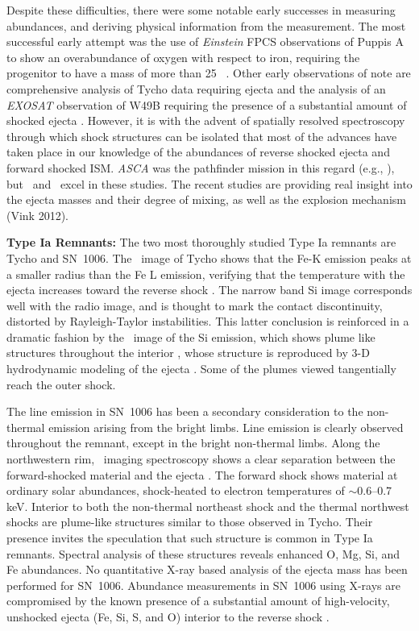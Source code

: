 \documentclass[11pt,a4paper]{article}
\begin{document}
{Despite these difficulties, there were some notable early successes in
measuring abundances, and deriving physical information from the
measurement. The most successful early attempt was the use of 
{\it Einstein} FPCS observations of Puppis A to show an overabundance of
oxygen with respect to iron, requiring the progenitor to have a mass
of more than 25 \msun\ \citep{canizares81}.  Other early observations
of note are comprehensive analysis of Tycho data requiring ejecta
\citep{hamilton86} and the analysis of an {\it EXOSAT} observation of
W49B requiring the presence of a substantial amount of shocked ejecta
\citep{smith85}. However, it is with the advent of spatially resolved
spectroscopy through which shock structures can be isolated that most
of the advances have taken place in our knowledge of the abundances of
reverse shocked ejecta and forward shocked ISM. {\it ASCA} was the
pathfinder mission in this regard (e.g., \citealt{holt94, hughes95}), but
\xmm\ and \chandra\ excel in these studies. The recent studies are
providing real insight into the ejecta masses and their degree of
mixing, as well as the explosion mechanism (Vink 2012).

{\bf Type Ia Remnants:} The two most thoroughly studied Type Ia
remnants are Tycho and SN~1006.  The \xmm\ image of Tycho shows
that the Fe-K emission peaks at a smaller radius than the Fe L
emission, verifying that the temperature with the ejecta increases
toward the reverse shock \citep{decourchelle01}. The narrow band Si
image corresponds well with the radio image, and is thought to mark
the contact discontinuity, distorted by Rayleigh-Taylor
instabilities. This latter conclusion is reinforced in a dramatic
fashion by the \chandra\ image of the Si emission, which shows plume
like structures throughout the interior \citep{hwang02, warren05},
whose structure is reproduced by 3-D hydrodynamic modeling of the
ejecta \citep{warren13}. Some of the plumes viewed tangentially reach
the outer shock.

The line emission in SN~1006 has been a secondary consideration to the
non-thermal emission arising from the bright limbs. Line emission is
clearly observed throughout the remnant, except in the bright
non-thermal limbs. Along the northwestern rim, \chandra\ imaging
spectroscopy shows a clear separation between the forward-shocked
material and the ejecta \citep{long03}. The forward shock shows
material at ordinary solar abundances, shock-heated to electron
temperatures of $\sim$0.6--0.7 keV. Interior to both the
non-thermal northeast shock and the thermal northwest shocks are
plume-like structures similar to those observed in Tycho. Their
presence invites the speculation that such structure is common in Type
Ia remnants. Spectral analysis of these structures reveals enhanced O,
Mg, Si, and Fe abundances.  No quantitative X-ray based analysis of
the ejecta mass has been performed for SN~1006. Abundance measurements
in SN~1006 using X-rays are compromised by the known presence of a
substantial amount of high-velocity, unshocked ejecta (Fe, Si, S, and
O) interior to the reverse shock \citep{wu83}.

}
\end{document}
